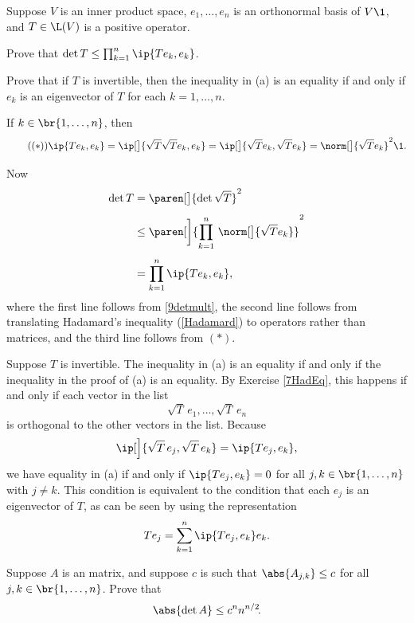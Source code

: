\exercise
Suppose $V$ is an inner product space, $e_1, \ldots, e_n$ is an orthonormal basis of $V\1$, and $T \in \L(V)$ is a positive operator.
\begin{subtheorem}
\item
Prove that $\det T \le \prod_{k=1}^n \ip{Te_k, e_k}$.
\item
Prove that if $T$ is invertible, then the inequality in (a) is an equality if and only if $e_k$ is an eigenvector of $T$ for each
$k = 1, \ldots, n$.
\end{subtheorem}
\exercisesubtheoremend

\begin{Solution}
\begin{subtheorem}
\item
If $k \in \br{1, \ldots, n}$, then
\[ \tag{$(*)$}
\ip{Te_k, e_k} = \ip[\big]{\sqrt{T} \sqrt{T} e_k, e_k} = \ip[\big]{\sqrt{T}e_k, \sqrt{T}e_k} = \norm[\big]{\sqrt{T}e_k}^2\1.
\]

Now
\begin{align*}
\det T &= \paren[\big]{ \det \sqrt{T} }^2 \\[4bp]
&\le \paren[\bigg]{ \prod_{k=1}^n \, \norm[\big]{ \sqrt{T} e_k} }^2 \\[4bp]
&= \prod_{k=1}^n \ip{Te_k, e_k},
\end{align*}
where the first line follows from \ref{9detmult}, the second line follows from translating Hadamard's inequality (\ref{Hadamard}) to operators rather than matrices, and the third line follows from $(*)$.

\item
Suppose $T$ is invertible. The inequality in (a) is an equality if and only if the inequality in the proof of (a) is an equality. By Exercise \ref{7HadEq}, this happens if and only if each vector in the list
\[
\sqrt{T} \, e_1, \ldots, \sqrt{T} \, e_n
\]
is orthogonal to the other vectors in the list. Because
\[
\ip[\Big]{ \sqrt{T} \, e_j , \sqrt{T} \, e_k } = \ip{Te_j, e_k},
\]
we have equality in (a) if and only if $\ip{Te_j, e_k} = 0$ for all $j, k \in \br{1, \ldots, n}$ with $j \ne k$. This condition is equivalent to the condition that each $e_j$ is an eigenvector of $T$, as can be seen by using the representation
\[
Te_j = \sum_{k=1}^n \ip{Te_j, e_k} e_k.
\]
\end{subtheorem}
\end{Solution}

\exercise
Suppose $A$ is an  matrix, and suppose $c$ is such that $\abs{A_{j,k}} \le c$ for all $j, k \in \br{1, \ldots, n}$. Prove that \label{2Had}
\[
\abs{\det A} \le c^n n^{n/2}\!.
\]
\exercisedisplayend
{} %

